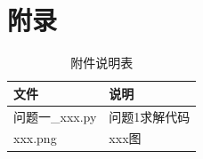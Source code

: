\makeatletter
\let\@oldaddcontentsline\addcontentsline
\renewcommand{\addcontentsline}[3]{}
\section*{附录}
\let\addcontentsline\@oldaddcontentsline
\makeatother

\begin{table}[H]
  \centering
  \caption{附件说明表}
  \label{tab:appendix}
  \renewcommand{\arraystretch}{1.2}
  \begin{tabularx}{\textwidth}{LX}
    \toprule
    文件 & 说明 \\
    \midrule
    问题一\_xxx.py & 问题1求解代码 \\
    xxx.png & xxx图 \\
    \bottomrule
  \end{tabularx}
\end{table}
